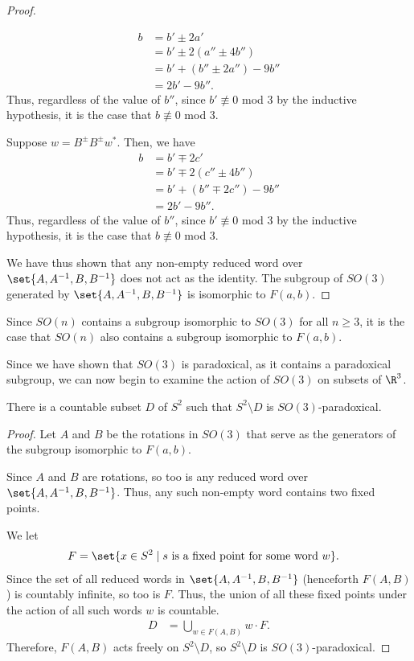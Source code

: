 \begin{proof}
\begin{description}
      \begin{align*}
        b &= b' \pm 2a'\\
          &= b' \pm 2\left(a'' \pm 4b''\right)\\
          &= b'+ \left(b'' \pm 2a''\right) - 9b''\\
          &= 2b' - 9b''.
      \end{align*}
      Thus, regardless of the value of $b''$, since $b'\nequiv 0$ mod $3$ by the inductive hypothesis, it is the case that $b\nequiv 0$ mod $3$.
    \item Suppose $w = B^{\pm}B^{\pm}w^{\ast}$. Then, we have
      \begin{align*}
        b &= b' \mp 2c'\\
          &= b' \mp 2\left(c'' \pm 4b''\right)\\
          &= b' + \left(b'' \mp 2c''\right) - 9b''\\
          &= 2b' - 9b''.
      \end{align*}
      Thus, regardless of the value of $b''$, since $b'\nequiv 0$ mod $3$ by the inductive hypothesis, it is the case that $b\nequiv 0$ mod $3$.
  \end{description}
  We have thus shown that any non-empty reduced word over $\set{A,A^{-1},B,B^{-1}}$ does not act as the identity. The subgroup of $SO(3)$ generated by $\set{A,A^{-1},B,B^{-1}}$ is isomorphic to $F(a,b)$.
\end{proof}
\begin{remark}
  Since $SO(n)$ contains a subgroup isomorphic to $SO(3)$ for all $n\geq 3$, it is the case that $SO(n)$ also contains a subgroup isomorphic to $F(a,b)$.
\end{remark}
Since we have shown that $SO(3)$ is paradoxical, as it contains a paradoxical subgroup, we can now begin to examine the action of $SO(3)$ on subsets of $\R^3$.
\begin{theorem}
  There is a countable subset $D$ of $S^{2}$ such that $S^{2}\setminus D$ is $SO(3)$-paradoxical.
\end{theorem}
\begin{proof}
  Let $A$ and $B$ be the rotations in $SO(3)$ that serve as the generators of the subgroup isomorphic to $F(a,b)$.\newline

  Since $A$ and $B$ are rotations, so too is any reduced word over $\set{A,A^{-1},B,B^{-1}}$. Thus, any such non-empty word contains two fixed points.\newline

  We let
  \begin{align*}
    F &= \set{x\in S^{2}\mid s\text{ is a fixed point for some word }w}.
  \end{align*}
  Since the set of all reduced words in $\set{A,A^{-1},B,B^{-1}}$ (henceforth $F(A,B)$) is countably infinite, so too is $F$. Thus, the union of all these fixed points under the action of all such words $w$ is countable.
  \begin{align*}
    D &= \bigcup_{w\in F(A,B)} w\cdot F.
  \end{align*}
  Therefore, $F(A,B)$ acts freely on $S^{2}\setminus D$, so $S^{2}\setminus D$ is $SO(3)$-paradoxical.
\end{proof}
